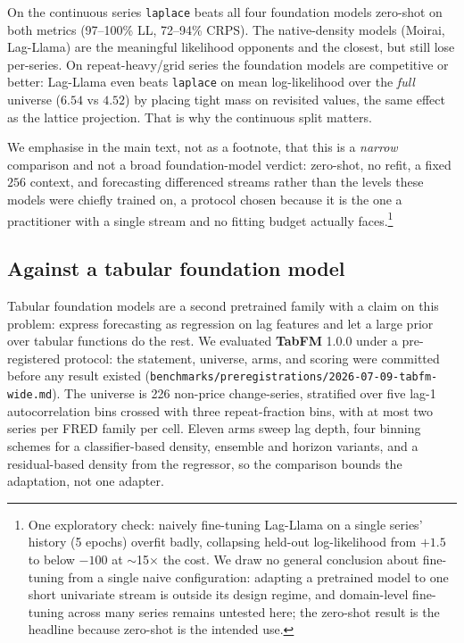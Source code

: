 \documentclass[article]{jss}
\providecommand{\pkg}[1]{\textbf{#1}}
\providecommand{\code}[1]{\texttt{#1}}
\begin{document}
On the continuous series \code{laplace} beats all four foundation models
zero-shot on both metrics (97--100\% LL, 72--94\% CRPS). The native-density
models (Moirai, Lag-Llama) are the meaningful likelihood opponents and the
closest, but still lose per-series. On repeat-heavy/grid series the foundation
models are competitive or better: Lag-Llama even beats \code{laplace} on mean
log-likelihood over the \emph{full} universe ($6.54$ vs $4.52$) by placing tight
mass on revisited values, the same effect as the lattice projection. That is
why the continuous split matters.

We emphasise in the main text, not as a
footnote, that this is a \emph{narrow} comparison and not a broad
foundation-model verdict: zero-shot, no refit, a fixed $256$ context, and
forecasting differenced streams rather than the levels these models were
chiefly trained on, a protocol chosen because it is the one a practitioner
with a single stream and no fitting budget actually faces.\footnote{One
exploratory check: naively fine-tuning Lag-Llama on a single series' history
(5 epochs) overfit badly, collapsing held-out log-likelihood from $+1.5$ to
below $-100$ at $\sim$15$\times$ the cost. We draw no general conclusion about
fine-tuning from a single naive configuration: adapting a pretrained model to
one short univariate stream is outside its design regime, and domain-level
fine-tuning across many series remains untested here; the zero-shot result is
the headline because zero-shot is the intended use.}

\subsection{Against a tabular foundation model}
\label{sec:tabfm}

Tabular foundation models are a second pretrained family with a claim on
this problem: express forecasting as regression on lag features and let a
large prior over tabular functions do the rest. We evaluated \pkg{TabFM}
1.0.0 \citep{tabfm2026} under a pre-registered protocol: the statement,
universe, arms, and scoring were committed before any result existed
(\code{benchmarks/preregistrations/2026-07-09-tabfm-wide.md}). The
universe is 226 non-price change-series, stratified over five lag-1
autocorrelation bins crossed with three repeat-fraction bins, with at most
two series per FRED family per cell. Eleven arms sweep lag depth, four
binning schemes for a classifier-based density, ensemble and horizon
variants, and a residual-based density from the regressor, so the
comparison bounds the adaptation, not one adapter.
\end{document}
